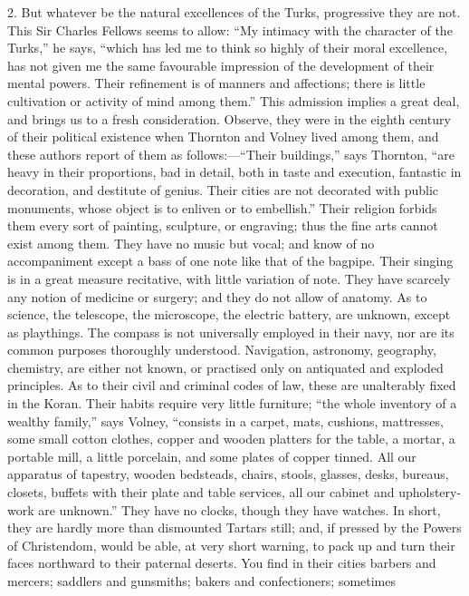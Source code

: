 2. But whatever be the natural
excellences of the Turks, progressive they are not. This Sir Charles
Fellows seems to allow: ``My intimacy with the character of the Turks,''
he says, ``which has led me to think so highly of their moral
excellence, has not given me the same favourable impression of the
development of their mental powers. Their refinement is of manners and
affections; there is little cultivation or activity of mind among
them.'' This admission implies a great deal, and brings us to a fresh
consideration. Observe, they were in the eighth century of their
political existence when Thornton and Volney lived among them, and
these authors report of them as follows:—``Their buildings,'' says
Thornton, ``are heavy in their proportions, bad in detail, both in
taste and execution, fantastic in decoration, and destitute of genius.
Their cities are not decorated with public monuments, whose object is
to enliven or to embellish.'' Their religion forbids them every sort of
painting, sculpture, or engraving; thus the fine arts cannot exist
among them. They have no music but vocal; and know of no accompaniment
except a bass of one note like that of the bagpipe. Their singing is
in a great measure recitative, with little variation of note. They
have scarcely any notion of medicine or surgery; and they do not
allow of anatomy. As to science, the telescope, the microscope, the
electric battery, are unknown, except as playthings. The compass is
not universally employed in their navy, nor are its common purposes
thoroughly understood. Navigation, astronomy, geography, chemistry,
are either not known, or practised only on antiquated and exploded
principles. As to their civil and criminal codes of law, these are
unalterably fixed in the Koran. Their habits require very little
furniture; ``the whole inventory of a wealthy family,'' says Volney, ``consists
in a carpet, mats, cushions, mattresses, some small cotton clothes,
copper and wooden platters for the table, a mortar, a portable mill, a
little porcelain, and some plates of copper tinned. All our apparatus
of tapestry, wooden bedsteads, chairs, stools, glasses, desks,
bureaus, closets, buffets with their plate and table services, all our
cabinet and upholstery-work are unknown.'' They have no clocks, though
they have watches. In short, they are hardly more than dismounted
Tartars still; and, if pressed by the Powers of Christendom, would be
able, at very short warning, to pack up and turn their faces northward
to their paternal deserts. You find in their cities barbers and
mercers; saddlers and gunsmiths; bakers and confectioners; sometimes
